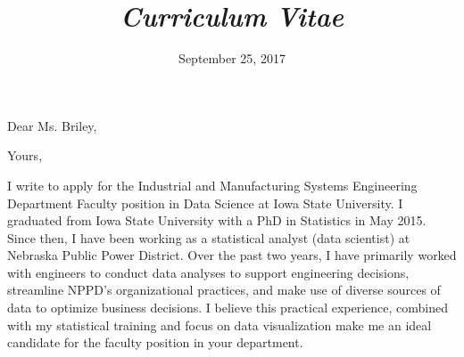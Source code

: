 \documentclass[12pt, letterpaper, sans]{moderncv}
\title{\emph{Curriculum Vitae}}
\begin{document}
\date{September 25, 2017}
\opening{Dear Ms. Briley,}
\closing{Yours,}
\makelettertitle
% 

I write to apply for the Industrial and Manufacturing Systems Engineering Department Faculty position in Data Science at Iowa State University. I graduated from Iowa State University with a PhD in Statistics in May 2015. Since then, I have been working as a statistical analyst (data scientist) at Nebraska Public Power District. Over the past two years, I have primarily worked with engineers to conduct data analyses to support engineering decisions, streamline NPPD's organizational practices, and make use of diverse sources of data to optimize business decisions. I believe this practical experience, combined with my statistical training and focus on data visualization make me an ideal candidate for the faculty position in your department.  



\end{document}
